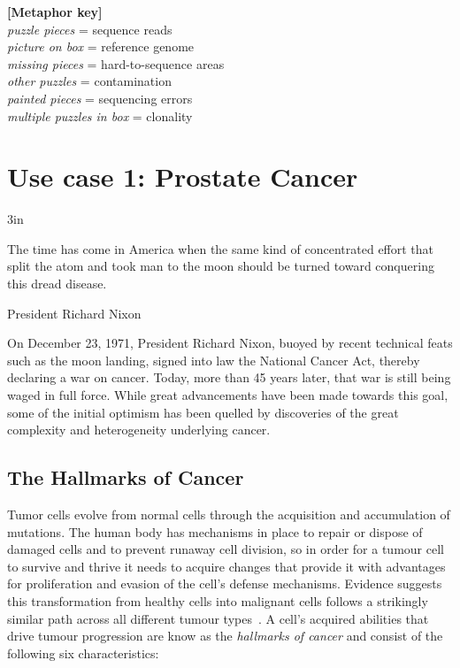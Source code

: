 \begin{justify}
\begin{center}
\begin{minipage}{6in}
\begin{center}
{\vspace*{0.5cm}
\textbf{[Metaphor key]} \\
\textit{puzzle pieces} = sequence reads \\
\textit{picture on box} = reference genome \\
\textit{missing pieces} = hard-to-sequence areas \\
\textit{other puzzles} = contamination \\
\textit{painted pieces} = sequencing errors \\
\textit{multiple puzzles in box} = clonality
}

\end{center}
\end{minipage}
\end{center}



\newpage
\section{Use case 1: Prostate Cancer}

\epigraph{3in}{The time has come in America when the same kind of concentrated effort that split the atom and took man to the moon should be turned toward conquering this dread disease.}{President Richard Nixon}

On December 23, 1971, President Richard Nixon, buoyed by recent technical feats such as the moon landing, signed into law the National Cancer Act, thereby declaring a war on cancer. Today, more than 45 years later, that war is still being waged in full force. While great advancements have been made towards this goal, some of the initial optimism has been quelled by discoveries of the great complexity and heterogeneity underlying cancer.


\subsection{The Hallmarks of Cancer}

Tumor cells evolve from normal cells through the acquisition and accumulation of mutations. The human body has mechanisms in place to repair or dispose of damaged cells and to prevent runaway cell division, so in order for a tumour cell to survive and thrive it needs to acquire changes that provide it with advantages for proliferation and evasion of the cell's defense mechanisms. Evidence suggests this transformation from healthy cells into malignant cells follows a strikingly similar path across all different tumour types~\cite{}. A cell's acquired abilities that drive tumour progression are know as the \emph{hallmarks of cancer} and consist of the following six characteristics:


\end{justify}
